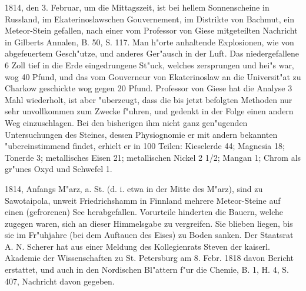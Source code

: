 \documentclass[a4paper, 11pt, oneside, polutonikogreek, german]{article}
\begin{document}
1814, den 3. Februar, um die Mittagszeit, ist bei hellem Sonnenscheine in Russland, im Ekaterinoslawschen Gouvernement, im Distrikte von Bachmut, ein Meteor-Stein gefallen, nach einer vom Professor von Giese mitgeteilten Nachricht in Gilberts Annalen, B. 50, S. 117. Man h"orte anhaltende Explosionen, wie von abgefeuertem Gesch"utze, und anderes Ger"ausch in der Luft. Das niedergefallene 6 Zoll tief in die Erde eingedrungene St"uck, welches zersprungen und hei"s war, wog 40 Pfund, und das vom Gouverneur von Ekaterinoslaw an die Universit"at zu Charkow geschickte wog gegen 20 Pfund. Professor von Giese hat die Analyse 3 Mahl wiederholt, ist aber "uberzeugt, dass die bis jetzt befolgten Methoden nur sehr unvollkommen zum Zwecke f"uhren, und gedenkt in der Folge einen andern Weg einzuschlagen. Bei den bisherigen ihm nicht ganz gen"ugenden Untersuchungen des Steines, dessen Physiognomie er mit andern bekannten "ubereinstimmend findet, erhielt er in 100 Teilen: Kieselerde 44; Magnesia 18; Tonerde 3; metallisches Eisen 21; metallischen Nickel 2 1/2; Mangan 1; Chrom als gr"unes Oxyd und Schwefel 1.

1814, Anfangs M"arz, a. St. (d. i. etwa in der Mitte des M"arz), sind zu Sawotaipola, unweit Friedrichshamm in Finnland mehrere Meteor-Steine auf einen (gefrorenen) See herabgefallen. Vorurteile hinderten die Bauern, welche zugegen waren, sich an dieser Himmelsgabe zu vergreifen. Sie blieben liegen, bis sie im Fr"uhjahre (bei dem Auftauen des Eises) zu Boden sanken. Der Staatsrat A. N. Scherer hat aus einer Meldung des Kollegienrats Steven der kaiserl. Akademie der Wissenschaften zu St. Petersburg am 8. Febr. 1818 davon Bericht erstattet, und auch in den Nordischen Bl"attern f"ur die Chemie, B. 1, H. 4, S. 407, Nachricht davon gegeben.
\end{document}
